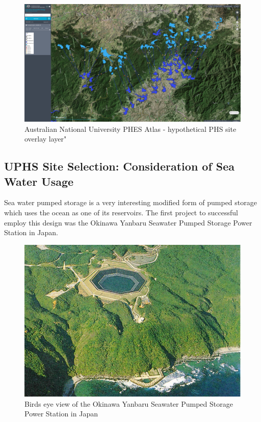\documentclass[hidelinks,12pt,a4paper]{article}
\begin{document}
\begin{figure}[ht!]
    \centering
    \includegraphics[width=1\textwidth]{australian-national-university-global-phes-atlas-water-overlay.png}
    \caption{Australian National University PHES Atlas - hypothetical PHS site overlay layer" \cite{AustralianNationalUniversityGlobalPHESAtlas}}
\end{figure}
\FloatBarrier

\subsection{UPHS Site Selection: Consideration of Sea Water Usage}
Sea water pumped storage is a very interesting modified form of pumped storage which uses the ocean as one of its reservoirs. The first project to successful employ this design was the Okinawa Yanbaru Seawater Pumped Storage Power Station in Japan. \cite{SeaWaterPumpedStoragePowerPlant}

\begin{figure}[ht!]
    \centering
    \includegraphics[width=.7\textwidth]{kaprun-hydroelectric-station.png}
    \caption{Birds eye view of the Okinawa Yanbaru Seawater Pumped Storage Power Station in Japan \cite{DevelopmentOfPumpTurbineForSeawaterPumpedStorage}}
\end{figure}
\end{document}
